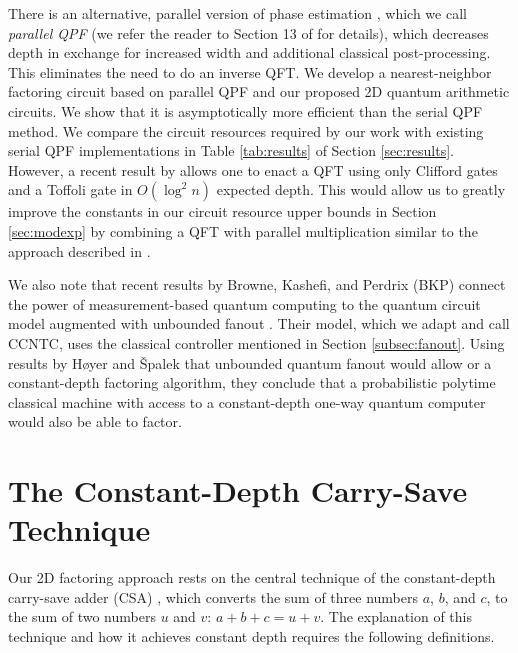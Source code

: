 \documentclass[twoside]{article}
\begin{document}
There is an alternative, parallel version of phase estimation 
\cite{Cleve2000,Kitaev2002}, which we call \emph{parallel QPF} (we refer the reader to Section 13 of \cite{Kitaev2002} for details), which decreases depth in exchange
for increased width and additional classical post-processing.
This eliminates the need to do an inverse QFT.
We develop a nearest-neighbor factoring circuit based on parallel QPF and our proposed 2D quantum arithmetic circuits.
We show that it is asymptotically more efficient than the serial QPF method. 
We compare the circuit resources required by our work with existing serial QPF implementations in Table
\ref{tab:results} of Section \ref{sec:results}.
However, a recent result by \cite{Jones2013} allows one to enact a
QFT using only Clifford gates and a Toffoli gate in $O(\log^2 n)$ expected depth.
This would allow us to
greatly improve the constants in our circuit resource upper bounds in Section \ref{sec:modexp} by combining a QFT with parallel multiplication similar to
the approach described in \cite{VanMeter2005,Cleve2000}.


We also note that recent results by Browne, Kashefi, and Perdrix (BKP) connect the power of
measurement-based quantum computing to the quantum circuit model augmented with
unbounded fanout \cite{Browne2009}. Their model, which we adapt and call
\textsc{CCNTC}, uses the classical controller mentioned in Section \ref{subsec:fanout}.
Using results by H{\o}yer and {\v S}palek \cite{Hoyer2002} that
unbounded quantum fanout would allow or a constant-depth factoring algorithm,
they conclude that a probabilistic polytime classical machine with access
to a constant-depth one-way quantum computer would also be able to factor.

%
\section{The Constant-Depth Carry-Save Technique}
\label{sec:csa}

Our 2D factoring approach rests on the central technique of the constant-depth
carry-save adder (CSA) \cite{Gossett1998}, which converts the sum of three
numbers $a$, $b$, and $c$, to the sum of two numbers $u$ and $v$:
$a+b+c = u+v$. The explanation of this technique and how it achieves constant depth requires the following definitions.
\end{document}
